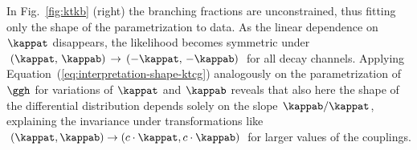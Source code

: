 In Fig.~\ref{fig:ktkb} (right) the branching fractions are unconstrained, thus fitting only the shape of the parametrization to data.
% 
As the linear dependence on $\kappat$ disappears, the likelihood becomes symmetric under $(\kappat,\,\kappab) \, \to \, (-\kappat,\,-\kappab)$ for all decay channels.
% 
Applying Equation~(\ref{eq:interpretation-shape-ktcg}) analogously on the parametrization of $\ggh$ for variations of $\kappat$ and $\kappab$ reveals that also here the shape of the differential distribution depends solely on the slope $\kappab/\kappat$, explaining the invariance under transformations like $(\kappat, \kappab) \to (c \cdot \kappat, c \cdot \kappab)$ for larger values of the couplings.



\begin{figure}[hbtp]
  \begin{center}
\end{center}
\end{figure}
